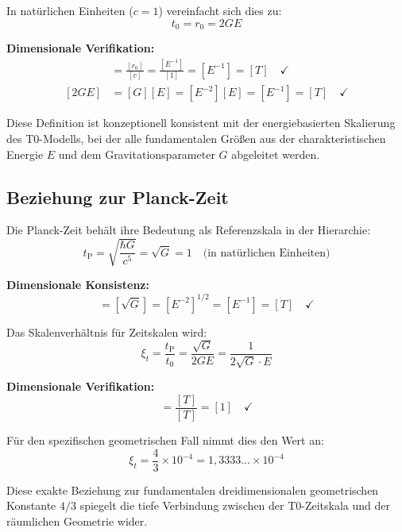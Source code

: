 \documentclass[12pt,a4paper]{report}
\newcommand{\tP}{t_{\text{P}}}            %
\newcommand{\rzero}{r_0}                  %
\newcommand{\tzero}{t_0}                  %
\begin{document}
	In natürlichen Einheiten ($c = 1$) vereinfacht sich dies zu:
	\begin{equation}
		\tzero = \rzero = 2GE
	\end{equation}
	
	\textbf{Dimensionale Verifikation:}
	\begin{align}
		[\tzero] &= \frac{[\rzero]}{[c]} = \frac{[E^{-1}]}{[1]} = [E^{-1}] = [T] \quad \checkmark \\
		[2GE] &= [G][E] = [E^{-2}][E] = [E^{-1}] = [T] \quad \checkmark
	\end{align}
	
	Diese Definition ist konzeptionell konsistent mit der energiebasierten Skalierung des T0-Modells, bei der alle fundamentalen Größen aus der charakteristischen Energie $E$ und dem Gravitationsparameter $G$ abgeleitet werden.
	
	\subsection{Beziehung zur Planck-Zeit}
	
	Die Planck-Zeit behält ihre Bedeutung als Referenzskala in der Hierarchie:
	\begin{equation}
		\tP = \sqrt{\frac{\hbar G}{c^5}} = \sqrt{G} = 1 \quad \text{(in natürlichen Einheiten)}
	\end{equation}
	
	\textbf{Dimensionale Konsistenz:}
	\begin{equation}
		[\tP] = [\sqrt{G}] = [E^{-2}]^{1/2} = [E^{-1}] = [T] \quad \checkmark
	\end{equation}
	
	Das Skalenverhältnis für Zeitskalen wird:
	\begin{equation}
		\xi_t = \frac{\tP}{\tzero} = \frac{\sqrt{G}}{2GE} = \frac{1}{2\sqrt{G} \cdot E}
	\end{equation}
	
	\textbf{Dimensionale Verifikation:}
	\begin{equation}
		[\xi_t] = \frac{[T]}{[T]} = [1] \quad \checkmark
	\end{equation}
	
	Für den spezifischen geometrischen Fall nimmt dies den Wert an:
	\begin{equation}
		\xi_t = \frac{4}{3} \times 10^{-4} = 1,3333... \times 10^{-4}
	\end{equation}
	
	Diese exakte Beziehung zur fundamentalen dreidimensionalen geometrischen Konstante $4/3$ spiegelt die tiefe Verbindung zwischen der T0-Zeitskala und der räumlichen Geometrie wider.
	
\end{document}
